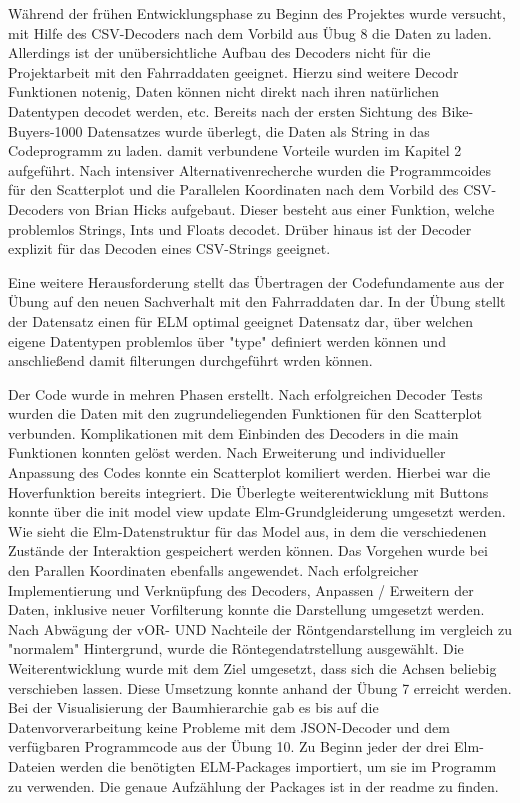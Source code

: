 \documentclass[usegeometry=true]{scrartcl}
\begin{document}
Während der frühen Entwicklungsphase zu Beginn des Projektes wurde versucht, mit Hilfe des CSV-Decoders nach dem Vorbild aus Übug 8 die Daten zu laden. Allerdings ist der unübersichtliche Aufbau des Decoders nicht für die Projektarbeit mit den Fahrraddaten geeignet. Hierzu sind weitere Decodr Funktionen notenig, Daten können nicht direkt nach ihren natürlichen Datentypen decodet werden, etc. Bereits nach der ersten Sichtung des Bike-Buyers-1000 Datensatzes wurde überlegt, die Daten als String in das Codeprogramm zu laden. damit verbundene Vorteile wurden im Kapitel 2 aufgeführt. 
Nach intensiver Alternativenrecherche wurden die Programmcoides für den Scatterplot und die Parallelen Koordinaten nach dem Vorbild des CSV-Decoders von Brian Hicks aufgebaut. Dieser besteht aus einer Funktion, welche problemlos Strings, Ints und Floats decodet. Drüber hinaus ist der Decoder explizit für das Decoden eines CSV-Strings geeignet. 

Eine weitere Herausforderung stellt das Übertragen der Codefundamente aus der Übung auf den neuen Sachverhalt mit den Fahrraddaten dar. In der Übung stellt der Datensatz einen für ELM optimal geeignet Datensatz dar, über welchen eigene Datentypen problemlos über "type" definiert werden können und anschließend damit filterungen durchgeführt wrden können. 


Der Code wurde in mehren Phasen erstellt. Nach erfolgreichen Decoder Tests wurden die Daten mit den zugrundeliegenden Funktionen für den Scatterplot verbunden. Komplikationen mit dem Einbinden des Decoders in die main Funktionen konnten gelöst werden. Nach Erweiterung und individueller Anpassung des Codes konnte ein Scatterplot komiliert werden. Hierbei war die Hoverfunktion bereits integriert. Die Überlegte weiterentwicklung mit Buttons konnte über die init model view update Elm-Grundgleiderung umgesetzt werden. 
Wie sieht die Elm-Datenstruktur für das Model aus, in dem die verschiedenen Zustände der Interaktion gespeichert werden können.
Das Vorgehen wurde bei den Parallen Koordinaten ebenfalls angewendet. Nach erfolgreicher Implementierung und Verknüpfung des Decoders, Anpassen / Erweitern der Daten, inklusive neuer Vorfilterung konnte die Darstellung umgesetzt werden. Nach Abwägung der vOR- UND Nachteile der Röntgendarstellung im vergleich zu "normalem" Hintergrund, wurde die Röntegendatrstellung ausgewählt. Die Weiterentwicklung wurde mit dem Ziel umgesetzt, dass sich die Achsen beliebig verschieben lassen. Diese Umsetzung konnte anhand der Übung 7 erreicht werden.
Bei der Visualisierung der Baumhierarchie gab es bis auf die Datenvorverarbeitung keine Probleme mit dem JSON-Decoder und dem verfügbaren Programmcode aus der Übung 10. 
Zu Beginn jeder der drei Elm-Dateien werden die benötigten ELM-Packages importiert, um sie im Programm zu verwenden. Die genaue Aufzählung der Packages ist in der readme zu finden. 
\end{document}

